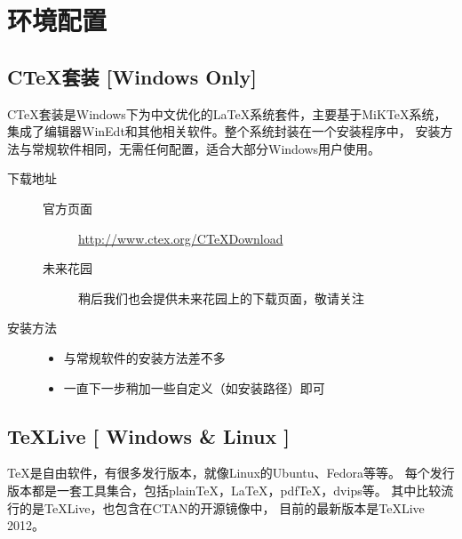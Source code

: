 \chapter{环境配置}

\section{C\TeX{}套装 [Windows Only]}

C\TeX{}套装是Windows下为中文优化的\LaTeX{}系统套件，主要基于MiKTeX系统，
集成了编辑器WinEdt和其他相关软件。整个系统封装在一个安装程序中，
安装方法与常规软件相同，无需任何配置，适合大部分Windows用户使用。

\begin{description}
    \item[下载地址] \hfill
    \begin{description}
        \item[官方页面]
            \url{http://www.ctex.org/CTeXDownload}
        \item[未来花园]
            稍后我们也会提供未来花园上的下载页面，敬请关注
    \end{description}
    \item[安装方法] \hfill
        \begin{itemize}
            \item[] 与常规软件的安装方法差不多
            \item[] 一直下一步稍加一些自定义（如安装路径）即可
        \end{itemize}
\end{description}

\section{\TeX{}Live [ Windows \& Linux ]}

\TeX{}是自由软件，有很多发行版本，就像Linux的Ubuntu、Fedora等等。
每个发行版本都是一套工具集合，包括plain\TeX{}，\LaTeX{}，pdf\TeX{}，dvips等。
其中比较流行的是\TeX{}Live，也包含在CTAN的开源镜像中，
目前的最新版本是\TeX{}Live 2012。

